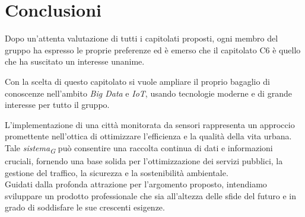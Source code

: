 \documentclass{article}
\begin{document}
\flushleft
\section{Conclusioni}
Dopo un'attenta valutazione di tutti i capitolati proposti, ogni membro del gruppo ha espresso le proprie preferenze ed è emerso che il capitolato C6 è quello che ha suscitato un interesse unanime.

Con la scelta di questo capitolato si vuole ampliare il proprio bagaglio di conoscenze nell’ambito \textit{Big Data} e \textit{IoT}, usando tecnologie moderne e di grande interesse per tutto il gruppo.

L'implementazione di una città monitorata da sensori rappresenta un approccio promettente nell'ottica di ottimizzare l'efficienza e la qualità della vita urbana. Tale \textit{sistema}\textsubscript{\textit{G}} può consentire una raccolta continua di dati e informazioni cruciali, fornendo una base solida per l'ottimizzazione dei servizi pubblici, la gestione del traffico, la sicurezza e la sostenibilità ambientale. \\
Guidati dalla profonda attrazione per l'argomento proposto, intendiamo sviluppare un prodotto professionale che sia all'altezza delle sfide del futuro e in grado di soddisfare le sue crescenti esigenze.
\end{document}
